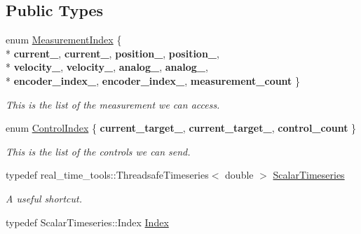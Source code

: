 \subsection*{Public Types}
\begin{DoxyCompactItemize}
\item 
enum \hyperlink{classblmc__drivers_1_1MotorBoardInterface_a8e869cbdb9fcc872ba5a33813e0dfafb}{Measurement\+Index} \{ \\*
{\bfseries current\+\_}, 
{\bfseries current\+\_}, 
{\bfseries position\+\_}, 
{\bfseries position\+\_}, 
\\*
{\bfseries velocity\+\_}, 
{\bfseries velocity\+\_}, 
{\bfseries analog\+\_}, 
{\bfseries analog\+\_}, 
\\*
{\bfseries encoder\+\_\+index\+\_}, 
{\bfseries encoder\+\_\+index\+\_}, 
{\bfseries measurement\+\_\+count}
 \}\hypertarget{classblmc__drivers_1_1MotorBoardInterface_a8e869cbdb9fcc872ba5a33813e0dfafb}{}\label{classblmc__drivers_1_1MotorBoardInterface_a8e869cbdb9fcc872ba5a33813e0dfafb}
\begin{DoxyCompactList}\small\item\em This is the list of the measurement we can access. \end{DoxyCompactList}
\item 
enum \hyperlink{classblmc__drivers_1_1MotorBoardInterface_a82ed4d0fa527521707281396095a88ca}{Control\+Index} \{ {\bfseries current\+\_\+target\+\_}, 
{\bfseries current\+\_\+target\+\_}, 
{\bfseries control\+\_\+count}
 \}\hypertarget{classblmc__drivers_1_1MotorBoardInterface_a82ed4d0fa527521707281396095a88ca}{}\label{classblmc__drivers_1_1MotorBoardInterface_a82ed4d0fa527521707281396095a88ca}
\begin{DoxyCompactList}\small\item\em This is the list of the controls we can send. \end{DoxyCompactList}
\item 
typedef real\+\_\+time\+\_\+tools\+::\+Threadsafe\+Timeseries$<$ double $>$ \hyperlink{classblmc__drivers_1_1MotorBoardInterface_a14e237254ba495a66091ea3a3a33fa75}{Scalar\+Timeseries}\hypertarget{classblmc__drivers_1_1MotorBoardInterface_a14e237254ba495a66091ea3a3a33fa75}{}\label{classblmc__drivers_1_1MotorBoardInterface_a14e237254ba495a66091ea3a3a33fa75}

\begin{DoxyCompactList}\small\item\em A useful shortcut. \end{DoxyCompactList}\item 
typedef Scalar\+Timeseries\+::\+Index \hyperlink{classblmc__drivers_1_1MotorBoardInterface_ab0e201396fe808cbc480b69768c81fa2}{Index}\hypertarget{classblmc__drivers_1_1MotorBoardInterface_ab0e201396fe808cbc480b69768c81fa2}{}\label{classblmc__drivers_1_1MotorBoardInterface_ab0e201396fe808cbc480b69768c81fa2}


\end{DoxyCompactItemize}
